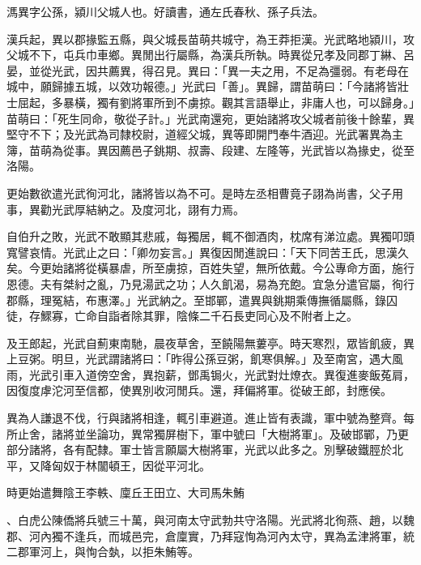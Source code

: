 
\begin{pinyinscope}
溤異字公孫，潁川父城人也。好讀書，通左氏春秋、孫子兵法。

漢兵起，異以郡掾監五縣，與父城長苗萌共城守，為王莽拒漢。光武略地潁川，攻父城不下，屯兵巾車鄉。異閒出行屬縣，為漢兵所執。時異從兄孝及同郡丁綝、呂晏，並從光武，因共薦異，得召見。異曰：「異一夫之用，不足為彊弱。有老母在城中，願歸據五城，以效功報德。」光武曰「善」。異歸，謂苗萌曰：「今諸將皆壯士屈起，多暴橫，獨有劉將軍所到不虜掠。觀其言語舉止，非庸人也，可以歸身。」苗萌曰：「死生同命，敬從子計。」光武南還宛，更始諸將攻父城者前後十餘輩，異堅守不下；及光武為司隸校尉，道經父城，異等即開門奉牛酒迎。光武署異為主簿，苗萌為從事。異因薦邑子銚期、叔壽、段建、左隆等，光武皆以為掾史，從至洛陽。

更始數欲遣光武徇河北，諸將皆以為不可。是時左丞相曹竟子詡為尚書，父子用事，異勸光武厚結納之。及度河北，詡有力焉。

自伯升之敗，光武不敢顯其悲戚，每獨居，輒不御酒肉，枕席有涕泣處。異獨叩頭寬譬哀情。光武止之曰：「卿勿妄言。」異復因閒進說曰：「天下同苦王氏，思漢久矣。今更始諸將從橫暴虐，所至虜掠，百姓失望，無所依戴。今公專命方面，施行恩德。夫有桀紂之亂，乃見湯武之功；人久飢渴，易為充飽。宜急分遣官屬，徇行郡縣，理冤結，布惠澤。」光武納之。至邯鄲，遣異與銚期乘傳撫循屬縣，錄囚徒，存鰥寡，亡命自詣者除其罪，陰條二千石長吏同心及不附者上之。

及王郎起，光武自薊東南馳，晨夜草舍，至饒陽無蔞亭。時天寒烈，眾皆飢疲，異上豆粥。明旦，光武謂諸將曰：「昨得公孫豆粥，飢寒俱解。」及至南宮，遇大風雨，光武引車入道傍空舍，異抱薪，鄧禹锔火，光武對灶燎衣。異復進麥飯菟肩，因復度虖沱河至信都，使異別收河閒兵。還，拜偏將軍。從破王郎，封應侯。

異為人謙退不伐，行與諸將相逢，輒引車避道。進止皆有表識，軍中號為整齊。每所止舍，諸將並坐論功，異常獨屏樹下，軍中號曰「大樹將軍」。及破邯鄲，乃更部分諸將，各有配隸。軍士皆言願屬大樹將軍，光武以此多之。別擊破鐵脛於北平，又降匈奴于林闟頓王，因從平河北。

時更始遣舞陰王李軼、廩丘王田立、大司馬朱鮪

、白虎公陳僑將兵號三十萬，與河南太守武勃共守洛陽。光武將北徇燕、趙，以魏郡、河內獨不逢兵，而城邑完，倉廩實，乃拜寇恂為河內太守，異為孟津將軍，統二郡軍河上，與恂合埶，以拒朱鮪等。


\end{pinyinscope}
